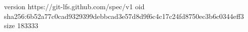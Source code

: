version https://git-lfs.github.com/spec/v1
oid sha256:6b52a77c0cad9329399debbcad3e57d8d9f6c4c17c24fd8750ec3b6c0344eff3
size 183333
